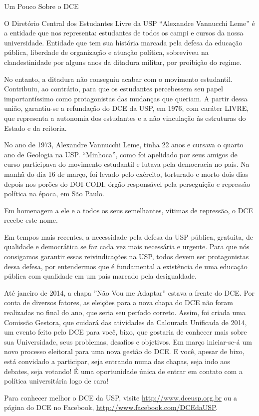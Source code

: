 \begin{secao}{Um Pouco Sobre o DCE}
 
O Diretório Central dos Estudantes Livre da USP ``Alexandre Vannucchi Leme'' é a
entidade que nos representa: estudantes de todos os campi e cursos da nossa universidade.
Entidade que tem sua história marcada pela defesa da educação pública, liberdade
de organização e atuação política, sobreviveu na clandestinidade por alguns anos
da ditadura militar, por proibição do regime.
 
No entanto, a ditadura não conseguiu acabar com o movimento estudantil. Contribuiu,
ao contrário, para que os estudantes percebessem seu papel importantíssimo como
protagonistas das mudanças que queriam. A partir dessa união, garantiu-se a
refundação do DCE da USP, em 1976, com caráter LIVRE, que representa a autonomia
dos estudantes e a não vinculação às estruturas do Estado e da reitoria.
 
No ano de 1973, Alexandre Vannucchi Leme, tinha 22 anos e cursava o quarto ano
de Geologia na USP. ``Minhoca'', como foi apelidado por seus amigos de curso participava
do movimento estudantil e lutava pela democracia no país. Na manhã do dia 16 de março,
foi levado pelo exército, torturado e morto dois dias depois nos porões do DOI-CODI,
órgão responsável pela perseguição e repressão política na época, em São Paulo.
 
Em homenagem a ele e a todos os seus semelhantes, vítimas de repressão, o DCE recebe este nome.
 
Em tempos mais recentes, a necessidade pela defesa da USP pública, gratuita, de qualidade
e democrática se faz cada vez mais necessária e urgente. Para que nós consigamos
garantir essas reivindicações na USP, todos devem ser protagonistas dessa defesa,
por entendermos que é fundamental a existência de uma educação pública com qualidade
em um país marcado pela desigualdade.
 
Até janeiro de 2014, a chapa ''Não Vou me Adaptar'' estava a frente do DCE. Por conta de diversos
fatores, as eleições para a nova chapa do DCE não foram realizadas no final do ano, que seria seu período correto. 
Assim, foi criada uma Comissão Gestora, que cuidará das atividades da Calourada Unificada de 2014, um evento feito pelo
DCE para você, bixo, que gostaria de conhecer mais sobre sua Universidade, seus problemas, desafios
e objetivos. Em março iniciar-se-á um novo processo eleitoral para uma nova gestão do DCE. E você, apesar
de bixo, está convidado a participar, seja entrando numa das chapas, seja indo aos debates, seja votando! 
É uma oportunidade única de entrar em contato com a política universitária logo de cara!

Para conhecer melhor o DCE da USP, visite \url{http://www.dceusp.org.br} ou a página do DCE no Facebook,
\url{http://www.facebook.com/DCEdaUSP}.

 
\end{secao}
